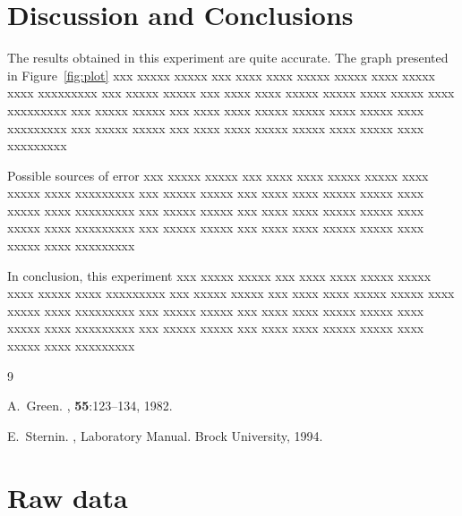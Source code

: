 \documentclass[12pt]{article}
\begin{document}
\section{Discussion and Conclusions}
The results obtained in this experiment are quite accurate.  The graph 
presented in Figure~\ref{fig:plot}
xxx xxxxx xxxxx xxx xxxx xxxx xxxxx xxxxx xxxx xxxxx xxxx
xxxxxxxxx xxx xxxxx xxxxx xxx xxxx xxxx xxxxx xxxxx xxxx xxxxx xxxx xxxxxxxxx
xxx xxxxx xxxxx xxx xxxx xxxx xxxxx xxxxx xxxx xxxxx xxxx xxxxxxxxx
xxx xxxxx xxxxx xxx xxxx xxxx xxxxx xxxxx xxxx xxxxx xxxx xxxxxxxxx

Possible sources of error 
xxx xxxxx xxxxx xxx xxxx xxxx xxxxx xxxxx xxxx xxxxx xxxx
xxxxxxxxx xxx xxxxx xxxxx xxx xxxx xxxx xxxxx xxxxx xxxx xxxxx xxxx xxxxxxxxx
xxx xxxxx xxxxx xxx xxxx xxxx xxxxx xxxxx xxxx xxxxx xxxx xxxxxxxxx
xxx xxxxx xxxxx xxx xxxx xxxx xxxxx xxxxx xxxx xxxxx xxxx xxxxxxxxx

In conclusion, this experiment 
xxx xxxxx xxxxx xxx xxxx xxxx xxxxx xxxxx xxxx xxxxx xxxx
xxxxxxxxx xxx xxxxx xxxxx xxx xxxx xxxx xxxxx xxxxx xxxx xxxxx xxxx xxxxxxxxx
xxx xxxxx xxxxx xxx xxxx xxxx xxxxx xxxxx xxxx xxxxx xxxx xxxxxxxxx
xxx xxxxx xxxxx xxx xxxx xxxx xxxxx xxxxx xxxx xxxxx xxxx xxxxxxxxx


\begin{thebibliography}{9}

A.~Green.
, {\bf 55}:123--134, 1982.

E.~Sternin.
, Laboratory Manual.
Brock University, 1994.

\end{thebibliography}

\appendix
\cleardoublepage

\section{Raw data}
\label{app:data}
\end{document}
